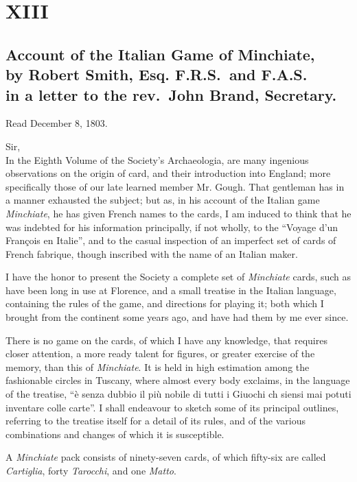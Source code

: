\documentclass[11pt,a5paper]{article}
\begin{document}
\section{XIII}
\subsection{Account of the Italian Game of Minchiate, \\ by Robert Smith, Esq. F.R.S.\ and F.A.S.\ \\in a letter to the rev.\ John Brand, Secretary.}

Read December 8, 1803.

Sir,\\
In the Eighth Volume of the Society's Archaeologia, are many ingenious observations on the origin of card, and their introduction into England; more specifically those of our late learned member Mr. Gough.
That gentleman has in a manner exhausted the subject; but as, in his account of the Italian game \textit{Minchiate}, he has given French names to the cards, I am induced to think that he was indebted for his information principally, if not wholly, to the ``Voyage d'un François en Italie'', and to the casual inspection of an imperfect set of cards of French fabrique, though inscribed with the name of an Italian maker.

I have the honor to present the Society a complete set of \textit{Minchiate} cards, such as have been long in use at Florence, and a small treatise in the Italian language, containing the rules of the game, and directions for playing it; both which I brought from the continent some years ago, and have had them by me ever since.

There is no game on the cards, of which I have any knowledge, that requires closer attention, a more ready talent for figures, or greater exercise of the memory, than this of \textit{Minchiate}.  It is held in high estimation among the fashionable circles in Tuscany, where almost every body exclaims, in the language of the treatise, ``è senza dubbio il più nobile di tutti i Giuochi ch siensi mai potuti inventare colle carte''.  I shall endeavour to sketch some of its principal outlines, referring to the treatise itself for a detail of its rules, and of the various combinations and changes of which it is susceptible.

A \textit{Minchiate} pack consists of ninety-seven cards, of which fifty-six are called \textit{Cartiglia}, forty \textit{Tarocchi}, and one \textit{Matto}.
\end{document}
